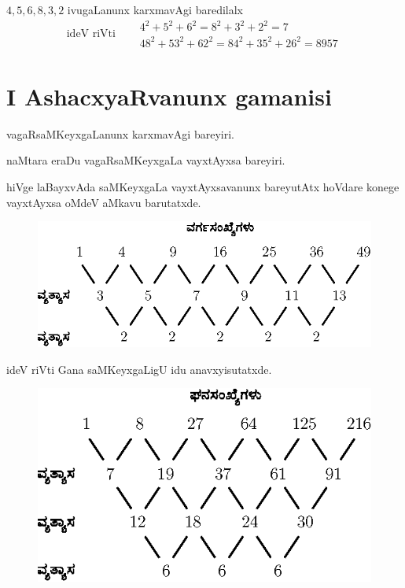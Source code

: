 $4,5,6,8,3,2$ ivugaLanunx karxmavAgi baredilalx
\begin{equation*}
\text{ideV riVti}\quad
\begin{aligned}
& 4^2+5^2+6^2 = 8^2+3^2+2^2 = 7\\
& 48^2 +53^2+62^2 = 84^2+35^2+26^2 = 8957
\end{aligned}
\end{equation*}

\section*{I AshacxyaRvanunx gamanisi}

vagaRsaMKeyxgaLanunx karxmavAgi bareyiri.

\noindent naMtara eraDu vagaRsaMKeyxgaLa vayxtAyxsa bareyiri.

\noindent hiVge laBayxvAda saMKeyxgaLa vayxtAyxsavanunx bareyutAtx hoVdare konege vayxtAyxsa oMdeV aMkavu barutatxde.
\begin{figure}[h]
\includegraphics{src/figure/085a.eps}
\end{figure}

ideV riVti Gana saMKeyxgaLigU idu anavxyisutatxde.

\vfill\eject
\begin{figure}[h]
\includegraphics{src/figure/085b.eps}
\end{figure}

